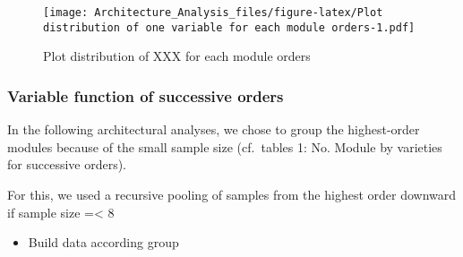 \documentclass[]{article}
\providecommand{\tightlist}{%
  \setlength{\itemsep}{0pt}\setlength{\parskip}{0pt}}
\begin{document}
\begin{figure}
\centering
\texttt{[image: Architecture\_Analysis\_files/figure-latex/Plot distribution of one variable for each module orders-1.pdf]}
\caption{Plot distribution of XXX for each module orders}
\end{figure}

\subsubsection{Variable function of successive
orders}\label{variable-function-of-successive-orders}

In the following architectural analyses, we chose to group the
highest-order modules because of the small sample size (cf.~tables 1:
No. Module by varieties for successive orders).

For this, we used a recursive pooling of samples from the highest order
downward if sample size =\textless{} 8

\begin{itemize}
\tightlist
\item
  Build data according group
\end{itemize}
\end{document}
